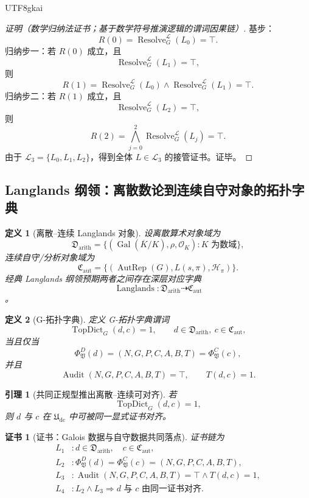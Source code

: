\documentclass[12pt]{article}
\newtheorem{definition}{定义}[section]
\newtheorem{lemma}{引理}[section]
\newtheorem{Certificate}{证书}[section]
\newcommand{\Udc}{\mathfrak{U}_{\mathrm{dc}}}
\newcommand{\Vsys}{\mathfrak V}
\DeclareMathOperator{\Audit}{Audit}
\DeclareMathOperator{\Resolve}{Resolve}
\DeclareMathOperator{\Langlands}{Langlands}
\DeclareMathOperator{\Gal}{Gal}
\DeclareMathOperator{\AutRep}{AutRep}
\DeclareMathOperator{\TopDict}{TopDict}
\begin{document}
\begin{CJK*}{UTF8}{gkai}
\begin{proof}[证明（数学归纳法证书；基于数学符号推演逻辑的谓词因果链）]
基步：
\[
  R(0)=\Resolve_G^{\mathcal L}(L_0)=\top.
\]
归纳步一：若 \(R(0)\) 成立，且
\[
  \Resolve_G^{\mathcal L}(L_1)=\top,
\]
则
\[
  R(1)
  =
  \Resolve_G^{\mathcal L}(L_0)
  \wedge
  \Resolve_G^{\mathcal L}(L_1)
  =
  \top.
\]
归纳步二：若 \(R(1)\) 成立，且
\[
  \Resolve_G^{\mathcal L}(L_2)=\top,
\]
则
\[
  R(2)
  =
  \bigwedge_{j=0}^{2}
  \Resolve_G^{\mathcal L}(L_j)
  =
  \top.
\]
由于 \(\mathcal L_3=\{L_0,L_1,L_2\}\)，得到全体 \(L\in\mathcal L_3\) 的接管证书。证毕。
\end{proof}

\subsection{Langlands 纲领：离散数论到连续自守对象的拓扑字典}
\label{subsec:tex59-langlands}

\begin{definition}[离散--连续 Langlands 对象]
\label{def:tex59-langlands-objects}
设离散算术对象域为
\[
  \mathfrak D_{\mathrm{arith}}
  =
  \{(\Gal(\overline K/K),\rho,\mathcal O_K):K\text{ 为数域}\},
\]
连续自守/分析对象域为
\[
  \mathfrak C_{\mathrm{aut}}
  =
  \{(\AutRep(G),L(s,\pi),\mathcal H_{\pi})\}.
\]
经典 Langlands 纲领预期两者之间存在深层对应字典
\[
  \Langlands:\mathfrak D_{\mathrm{arith}}\dashrightarrow\mathfrak C_{\mathrm{aut}}
\]
\cite{Langlands1970Problems,Gelbart1984AutomorphicForms,Frenkel2007Langlands}。
\end{definition}

\begin{definition}[G-拓扑字典]
\label{def:tex59-g-topological-dictionary}
定义 G-拓扑字典谓词
\[
  \TopDict_G(d,c)=1,
  \qquad
  d\in\mathfrak D_{\mathrm{arith}},\ c\in\mathfrak C_{\mathrm{aut}},
\]
当且仅当
\[
  \Phi_{\Vsys}^{D}(d)
  =
  (N,G,P,C,A,B,T)
  =
  \Phi_{\Vsys}^{C}(c),
\]
并且
\[
  \Audit(N,G,P,C,A,B,T)=\top,
  \qquad
  T(d,c)=1.
\]
\end{definition}

\begin{lemma}[共同正规型推出离散--连续可对齐]
\label{lem:tex59-langlands-common-nf}
若
\[
  \TopDict_G(d,c)=1,
\]
则 \(d\) 与 \(c\) 在 \(\Udc\) 中可被同一显式证书对齐。
\end{lemma}

\begin{Certificate}[证书：Galois 数据与自守数据共同落点]
\label{cert:tex59-langlands-common-nf}
证书链为
\[
\begin{aligned}
  L_1 &: d\in\mathfrak D_{\mathrm{arith}},\quad c\in\mathfrak C_{\mathrm{aut}},\\
  L_2 &: \Phi_{\Vsys}^{D}(d)=\Phi_{\Vsys}^{C}(c)=(N,G,P,C,A,B,T),\\
  L_3 &: \Audit(N,G,P,C,A,B,T)=\top\wedge T(d,c)=1,\\
  L_4 &: L_2\wedge L_3
       \Rightarrow d\text{ 与 }c\text{ 由同一证书对齐}.
\end{aligned}
\]
\end{Certificate}


\end{CJK*}
\end{document}
